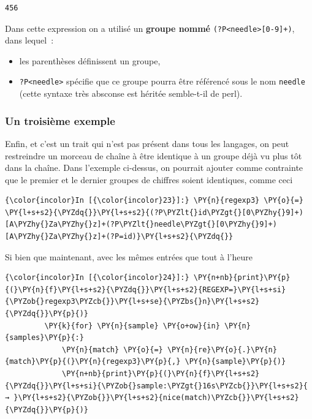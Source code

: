     \begin{Verbatim}[commandchars=\\\{\}]
456

    \end{Verbatim}

    Dans cette expression on a utilisé un \textbf{groupe nommé}
\texttt{(?P\textless{}needle\textgreater{}{[}0-9{]}+)}, dans lequel~:

\begin{itemize}
	\item 
	les parenthèses définissent un groupe,
	\item
	\texttt{?P\textless{}needle\textgreater{}} spécifie que ce groupe pourra
	être référencé sous le nom \texttt{needle} (cette syntaxe très absconse
	est héritée semble-t-il de perl).
\end{itemize}

    \hypertarget{un-troisiuxe8me-exemple}{%
\subsubsection{Un troisième exemple}\label{un-troisiuxe8me-exemple}}

    Enfin, et c'est un trait qui n'est pas présent dans tous les langages,
on peut restreindre un morceau de chaîne à être identique à un groupe
déjà vu plus tôt dans la chaîne. Dans l'exemple ci-dessus, on pourrait
ajouter comme contrainte que le premier et le dernier groupes de
chiffres soient identiques, comme ceci

    \begin{Verbatim}[commandchars=\\\{\}]
{\color{incolor}In [{\color{incolor}23}]:} \PY{n}{regexp3} \PY{o}{=} \PY{l+s+s2}{\PYZdq{}}\PY{l+s+s2}{(?P\PYZlt{}id\PYZgt{}[0\PYZhy{}9]+)[A\PYZhy{}Za\PYZhy{}z]+(?P\PYZlt{}needle\PYZgt{}[0\PYZhy{}9]+)[A\PYZhy{}Za\PYZhy{}z]+(?P=id)}\PY{l+s+s2}{\PYZdq{}}
\end{Verbatim}


    Si bien que maintenant, avec les mêmes entrées que tout à l'heure

    \begin{Verbatim}[commandchars=\\\{\}]
{\color{incolor}In [{\color{incolor}24}]:} \PY{n+nb}{print}\PY{p}{(}\PY{n}{f}\PY{l+s+s2}{\PYZdq{}}\PY{l+s+s2}{REGEXP=}\PY{l+s+si}{\PYZob{}regexp3\PYZcb{}}\PY{l+s+se}{\PYZbs{}n}\PY{l+s+s2}{\PYZdq{}}\PY{p}{)}
         \PY{k}{for} \PY{n}{sample} \PY{o+ow}{in} \PY{n}{samples}\PY{p}{:}
             \PY{n}{match} \PY{o}{=} \PY{n}{re}\PY{o}{.}\PY{n}{match}\PY{p}{(}\PY{n}{regexp3}\PY{p}{,} \PY{n}{sample}\PY{p}{)}
             \PY{n+nb}{print}\PY{p}{(}\PY{n}{f}\PY{l+s+s2}{\PYZdq{}}\PY{l+s+si}{\PYZob{}sample:\PYZgt{}16s\PYZcb{}}\PY{l+s+s2}{ → }\PY{l+s+s2}{\PYZob{}}\PY{l+s+s2}{nice(match)\PYZcb{}}\PY{l+s+s2}{\PYZdq{}}\PY{p}{)}    
\end{Verbatim}


